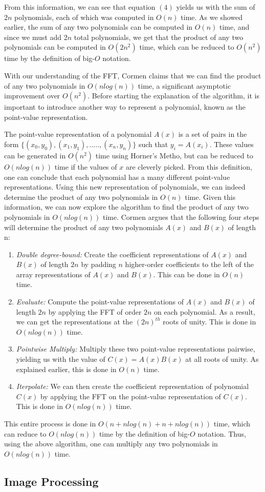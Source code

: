 \documentclass{amsproc}
\begin{document}
From this information, we can see that equation $(4)$ yields us with the sum of $2n$ polynomials, each of which was computed in $O(n)$ time. As we showed earlier, the sum of any two polynomials can be computed in $O(n)$ time, and since we must add $2n$ total polynomials, we get that the product of any two polynomials can be computed in $O(2n^2)$ time, which can be reduced to $O(n^2)$ time by the definition of big-$O$ notation.

With our understanding of the FFT, Cormen claims that we can find the product of any two polynomials in $O(nlog(n))$ time, a significant asymptotic improvement over $O(n^2)$.  Before starting the explanation of the algorithm, it is important to introduce another way to represent a polynomial, known as the point-value representation. 

The point-value representation of a polynomial $A(x)$ is a set of pairs in the form ${\{(x_0, y_0), (x_1, y_1), ..... , (x_n, y_n)\}}$ such that $y_i = A(x_i)$.  These values can be generated in $O(n^2)$  time using Horner's Metho, but can be reduced to $O(nlog(n))$ time if the values of $x$ are cleverly picked. From this definition, one can conclude that each polynomial has a many different point-value representations. Using this new representation of polynomials, we can indeed determine the product of any two polynomials in $O(n)$ time. Given this information, we can now explore the algorithm to find the product of any two polynomials in $O(nlog(n))$ time. Cormen argues that the following four steps will determine the product of any two polynomials $A(x)$ and $B(x)$ of length n:

\begin{enumerate}
	\item \textit{Double degree-bound: } Create the coefficient representations of $A(x)$ and $B(x)$ of length $2n$ by padding $n$ higher-order coefficients to the left of the array representations of $A(x)$ and $B(x)$. This can be done in $O(n)$ time.
	\item \textit{Evaluate: } Compute the point-value representations of $A(x)$ and $B(x)$ of length $2n$ by applying the FFT of order $2n$ on each polynomial. As a result, we can get the representations at the $(2n)^{th}$ roots of unity. This is done in $O(nlog(n))$ time.
	\item \textit{Pointwise Multiply: } Multiply these two point-value representations pairwise, yielding us with the value of $C(x) = A(x)B(x)$ at all roots of unity. As explained earlier, this is done in $O(n)$ time.
	\item \textit{Iterpolate: } We can then create the coefficient representation of polynomial  $C(x)$ by applying the FFT on the point-value representation of $C(x)$. This is done in $O(nlog(n))$ time.

\end{enumerate}

This entire process is done in $O(n + nlog(n) + n + nlog(n))$ time, which can reduce to $O(nlog(n))$ time by the definition of big-$O$ notation. Thus, using the above algorithm, one can multiply any two polynomials in $O(nlog(n))$ time.

\subsection{Image Processing}
\end{document}
